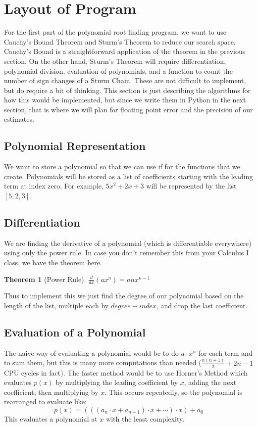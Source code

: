 \documentclass[]{article}
\theoremstyle{definition}
\newtheorem{theorem}{Theorem}[section]
\begin{document}
\section{Layout of Program}
For the first part of the polynomial root finding program, we want to use Cauchy's Bound Theorem and Sturm's Theorem to reduce our search space. Cauchy's Bound is a straightforward application of the theorem in the previous section. On the other hand, Sturm's Theorem will require differentiation, polynomial division, evaluation of polynomials, and a function to count the number of sign changes of a Sturm Chain. These are not difficult to implement, but do require a bit of thinking. This section is just describing the algorithms for how this would be implemented, but since we write them in Python in the next section, that is where we will plan for floating point error and the precision of our estimates.

\subsection{Polynomial Representation}
We want to store a polynomial so that we can use if for the functions that we create. Polynomials will be stored as a list of coefficients starting with the leading term at index zero. For example, $5x^2 + 2x + 3$ will be represented by the list $[5,  2, 3]$. 

\subsection{Differentiation}
We are finding the derivative of a polynomial (which is differentiable everywhere) using only the power rule. In case you don't remember this from your Calculus I class, we have the theorem here.
\begin{theorem}[Power Rule]
\label{power_rule}
$\frac{d}{dx}(ax^n) = anx^{n - 1}$
\end{theorem}
Thus to implement this we just find the degree of our polynomial based on the length of the list, multiple each by $degree - index$, and drop the last coefficient.

\subsection{Evaluation of a Polynomial}
The naive way of evaluating a polynomial would be to do $a \cdot x^n$ for each term and to sum them, but this is many more computations than needed ($\frac{n (n + 1)}{2} + 2n - 1$ CPU cycles in fact). The faster method would be to use Horner's Method which evaluates $p(x)$ by multiplying the leading coefficient by $x$, adding the next coefficient, then multiplying by $x$. This occurs repeatedly, so the polynomial is rearranged to evaluate like:
\begin{equation*}
p(x) = (((a_n \cdot x + a_{n-1}) \cdot x + \cdots) \cdot x) + a_0
\end{equation*}
This evaluates a polynomial at $x$ with the least complexity.
\end{document}
